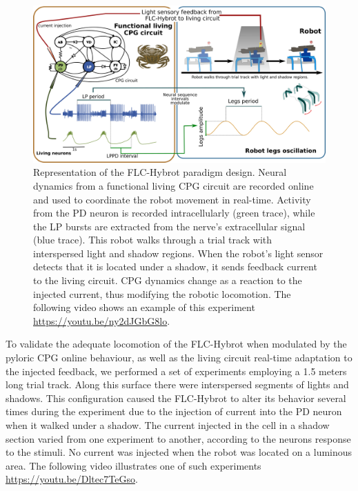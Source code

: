 \begin{figure}[h!]
	\begin{center}
		\includegraphics[width=\linewidth]{img/invariants/robot/Figure1_experiment_design_v1.png}
	\end{center}
	\caption{Representation of the FLC-Hybrot paradigm design. Neural dynamics from a functional living CPG circuit are recorded online and used to coordinate the robot movement in real-time. Activity from the PD neuron is recorded intracellularly (green trace), while the LP bursts are extracted from the nerve's extracellular signal (blue trace). This robot walks through a trial track with interspersed light and shadow regions. When the robot's light sensor detects that it is located under a shadow, it sends feedback current to the living circuit. CPG dynamics change as a reaction to the injected current, thus modifying the robotic locomotion. The following video shows an example of this experiment \url{https://youtu.be/ny2dJGbG8lo}.}
	\label{fig:robot_results_summary}
\end{figure}

To validate the adequate locomotion of the FLC-Hybrot when modulated by the pyloric CPG online behaviour, as well as the living circuit real-time adaptation to the injected feedback, we performed a set of experiments employing a 1.5 meters long trial track. Along this surface there were interspersed segments of lights and shadows. This configuration caused the FLC-Hybrot to alter its behavior several times during the experiment due to the injection of current into the PD neuron when it walked under a shadow. The current injected in the cell in a shadow section varied from one experiment to another, according to the neurons response to the stimuli. No current was injected when the robot was located on a luminous area. The following video illustrates one of such experiments \url{https://youtu.be/Dltec7TeGso}.

